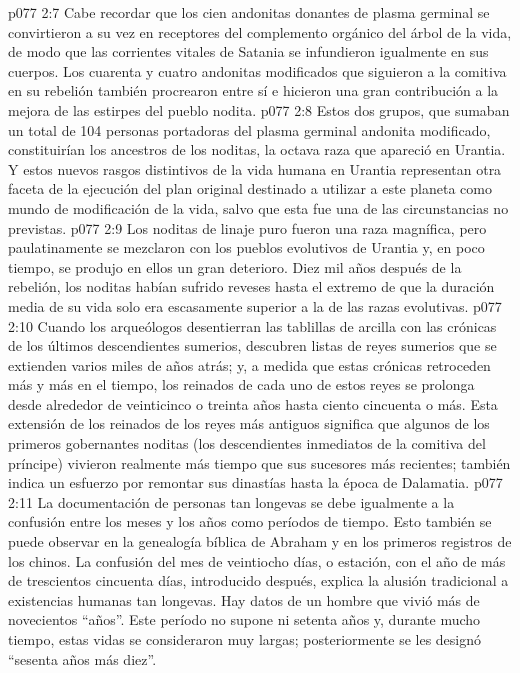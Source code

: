\vs p077 2:7 \pc Cabe recordar que los cien andonitas donantes de plasma germinal se convirtieron a su vez en receptores del complemento orgánico del árbol de la vida, de modo que las corrientes vitales de Satania se infundieron igualmente en sus cuerpos. Los cuarenta y cuatro andonitas modificados que siguieron a la comitiva en su rebelión también procrearon entre sí e hicieron una gran contribución a la mejora de las estirpes del pueblo nodita.
\vs p077 2:8 Estos dos grupos, que sumaban un total de 104 personas portadoras del plasma germinal andonita modificado, constituirían los ancestros de los noditas, la octava raza que apareció en Urantia. Y estos nuevos rasgos distintivos de la vida humana en Urantia representan otra faceta de la ejecución del plan original destinado a utilizar a este planeta como mundo de modificación de la vida, salvo que esta fue una de las circunstancias no previstas.
\vs p077 2:9 \pc Los noditas de linaje puro fueron una raza magnífica, pero paulatinamente se mezclaron con los pueblos evolutivos de Urantia y, en poco tiempo, se produjo en ellos un gran deterioro. Diez mil años después de la rebelión, los noditas habían sufrido reveses hasta el extremo de que la duración media de su vida solo era escasamente superior a la de las razas evolutivas.
\vs p077 2:10 Cuando los arqueólogos desentierran las tablillas de arcilla con las crónicas de los últimos descendientes sumerios, descubren listas de reyes sumerios que se extienden varios miles de años atrás; y, a medida que estas crónicas retroceden más y más en el tiempo, los reinados de cada uno de estos reyes se prolonga desde alrededor de veinticinco o treinta años hasta ciento cincuenta o más. Esta extensión de los reinados de los reyes más antiguos significa que algunos de los primeros gobernantes noditas (los descendientes inmediatos de la comitiva del príncipe) vivieron realmente más tiempo que sus sucesores más recientes; también indica un esfuerzo por remontar sus dinastías hasta la época de Dalamatia.
\vs p077 2:11 La documentación de personas tan longevas se debe igualmente a la confusión entre los meses y los años como períodos de tiempo. Esto también se puede observar en la genealogía bíblica de Abraham y en los primeros registros de los chinos. La confusión del mes de veintiocho días, o estación, con el año de más de trescientos cincuenta días, introducido después, explica la alusión tradicional a existencias humanas tan longevas. Hay datos de un hombre que vivió más de novecientos “años”. Este período no supone ni setenta años y, durante mucho tiempo, estas vidas se consideraron muy largas; posteriormente se les designó “sesenta años más diez”.
